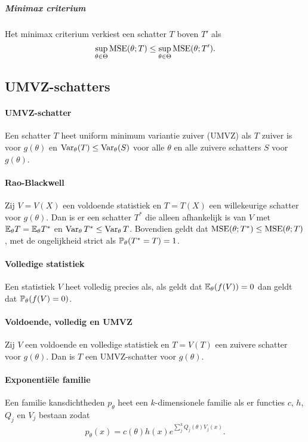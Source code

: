 \subparagraph{Minimax criterium} Het minimax criterium verkiest een schatter \(T\) boven \(T'\) als
\[
    \sup_{\theta\in\Theta}\operatorname{MSE}(\theta; T)\leq\sup_{\theta\in\Theta}\operatorname{MSE}(\theta;T').
\]

\subsection{UMVZ-schatters}
\paragraph{UMVZ-schatter} Een schatter \(T\) heet uniform minimum variantie zuiver (UMVZ) als \(T\) zuiver is voor \(g(\theta)\) en \(\operatorname{Var}_{\theta}(T)\leq\operatorname{Var}_{\theta}(S)\) voor alle \(\theta\) en alle zuivere schatters \(S\) voor \(g(\theta)\).

\paragraph{Rao-Blackwell} Zij \(V=V(X)\) een voldoende statistiek en \(T=T(X)\) een willekeurige schatter voor \(g(\theta)\). Dan is er een schatter \(T^{*}\) die alleen afhankelijk is van \(V\) met \(\mathbb{E}_{\theta}T=\mathbb{E}_{\theta}T^{*}\) en \(\operatorname{Var}_{\theta}T^{*}\leq\operatorname{Var}_{\theta}T\). Bovendien geldt dat \(\operatorname{MSE}(\theta;T^{*})\leq\operatorname{MSE}(\theta;T)\), met de ongelijkheid strict als \(\mathbb{P}_{\theta}(T^{*}=T)=1\).

\paragraph{Volledige statistiek} Een statistiek \(V\) heet volledig precies als, als geldt dat \(\mathbb{E}_{\theta}(f(V))=0\) dan geldt dat \(\mathbb{P}_{\theta}(f(V)=0)\).

\paragraph{Voldoende, volledig en UMVZ} Zij \(V\) een voldoende en volledige statistiek en \(T=V(T)\) een zuivere schatter voor \(g(\theta)\). Dan is \(T\) een UMVZ-schatter voor \(g(\theta)\).

\paragraph{Exponentiële familie} Een familie kansdichtheden \(p_{\theta}\) heet een \(k\)-dimensionele familie als er functies \(c\), \(h\), \(Q_{j}\) en \(V_{j}\) bestaan zodat
\[
    p_{\theta}(x)=c(\theta)h(x)e^{\sum_{j}^{k}Q_{j}(\theta)V_{j}(x)}.
\]

